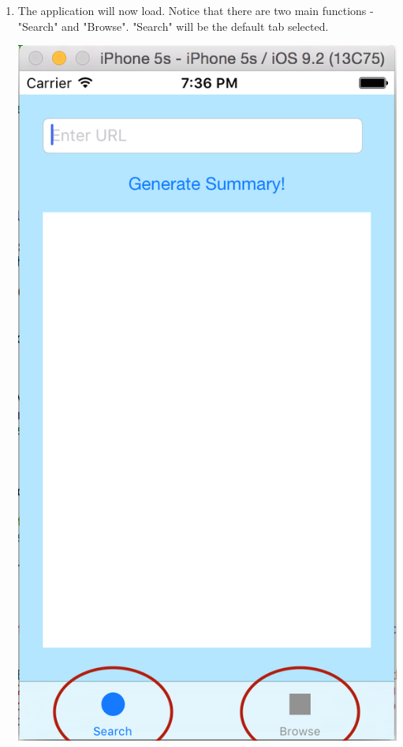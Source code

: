 \documentclass[11pt, margin=1in]{article}
\begin{document}
\begin{enumerate}
\item
The application will now load.  Notice that there are two main functions - "Search" and "Browse".  "Search" will be the default tab selected.  
\begin{center}
\includegraphics[scale=0.7]{3.jpg}
\end{center}

\end{enumerate}
\end{document}
